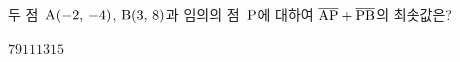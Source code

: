 두 점~$\mathrm{A}(-2,\,-4)$, $\mathrm{B}(3,\,8)$과 임의의 점~$\mathrm{P}$에 대하여 $\overline{\mathrm{AP}}+\overline{\mathrm{PB}}$의 최솟값은?
\begin{choices32}{$7$}{$9$}{$11$}{$13$}{$15$}\end{choices32}
